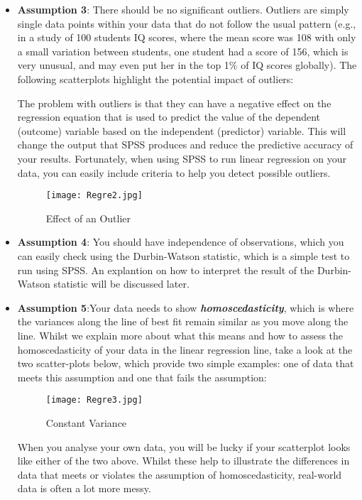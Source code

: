 \documentclass[a4paper,12pt]{article}
\begin{document}
\begin{itemize}
\item \textbf{Assumption 3}: There should be no significant outliers. Outliers are simply single data points within your data that do not follow the usual pattern (e.g., in a study of 100 students IQ scores, where the mean score was 108 with only a small variation between students, one student had a score of 156, which is very unusual, and may even put her in the top 1\% of IQ scores globally). The following scatterplots highlight the potential impact of outliers:

The problem with outliers is that they can have a negative effect on the regression equation that is used to predict the value of the dependent (outcome) variable based on the independent (predictor) variable. This will change the output that SPSS produces and reduce the predictive accuracy of your results. Fortunately, when using SPSS to run linear regression on your data, you can easily include criteria to help you detect possible outliers.
\begin{figure}[h!]
\begin{centering}
  \texttt{[image: Regre2.jpg]}\\
  \caption{Effect of an Outlier}
\end{centering}
\end{figure}
\item \textbf{Assumption 4}: You should have independence of observations, which you can easily check using the Durbin-Watson statistic, which is a simple test to run using SPSS. An explantion on how to interpret the result of the Durbin-Watson statistic will be discussed later.

\item \textbf{Assumption 5}:Your data needs to show \textbf{\textit{homoscedasticity}}, which is where the variances along the line of best fit remain similar as you move along the line. Whilst we explain more about what this means and how to assess the homoscedasticity of your data in the linear regression line, take a look at the two scatter-plots below, which provide two simple examples: one of data that meets this assumption and one that fails the assumption:

\begin{figure}[h!]
\begin{centering}
  \texttt{[image: Regre3.jpg]}\\
  \caption{Constant Variance}
\end{centering}
\end{figure}
When you analyse your own data, you will be lucky if your scatterplot looks like either of the two above. Whilst these help to illustrate the differences in data that meets or violates the assumption of homoscedasticity, real-world data is often a lot more messy.


\end{itemize}
\end{document}
